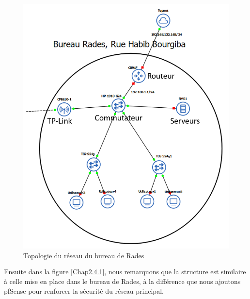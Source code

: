 \begin{figure}[H]
\centering
\includegraphics[width=16cm]{Images/BRades-Topologie.png}
\caption{Topologie du réseau du bureau de Rades}
\label{Chap2.2.0}
\end{figure}

Ensuite dans la figure \ref{Chap2.4.1}, nous remarquons que la structure est similaire à celle mise en place dans le bureau de Rades, à la différence que nous ajoutons pfSense pour renforcer la sécurité du réseau principal.

